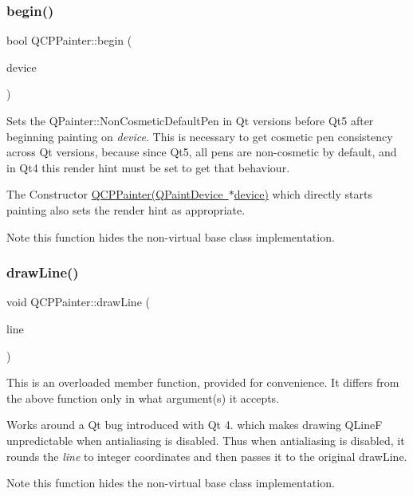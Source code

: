 \subsubsection{\texorpdfstring{begin()}{begin()}}
{\footnotesize\ttfamily bool Q\+C\+P\+Painter\+::begin (\begin{DoxyParamCaption}\item[{Q\+Paint\+Device $\ast$}]{device }\end{DoxyParamCaption})}

Sets the Q\+Painter\+::\+Non\+Cosmetic\+Default\+Pen in Qt versions before Qt5 after beginning painting on {\itshape device}. This is necessary to get cosmetic pen consistency across Qt versions, because since Qt5, all pens are non-\/cosmetic by default, and in Qt4 this render hint must be set to get that behaviour.

The Constructor \mbox{\hyperlink{class_q_c_p_painter_ae58dbb1795ddc4351ab324dc9898aa22}{Q\+C\+P\+Painter(\+Q\+Paint\+Device $\ast$device)}} which directly starts painting also sets the render hint as appropriate.

\begin{DoxyNote}{Note}
this function hides the non-\/virtual base class implementation. 
\end{DoxyNote}
\mbox{\label{class_q_c_p_painter_a0b4b1b9bd495e182c731774dc800e6e0}} 
\subsubsection{\texorpdfstring{draw\+Line()}{drawLine()}}
{\footnotesize\ttfamily void Q\+C\+P\+Painter\+::draw\+Line (\begin{DoxyParamCaption}\item[{const Q\+LineF \&}]{line }\end{DoxyParamCaption})}

This is an overloaded member function, provided for convenience. It differs from the above function only in what argument(s) it accepts.

Works around a Qt bug introduced with Qt 4. which makes drawing Q\+LineF unpredictable when antialiasing is disabled. Thus when antialiasing is disabled, it rounds the {\itshape line} to integer coordinates and then passes it to the original draw\+Line.

\begin{DoxyNote}{Note}
this function hides the non-\/virtual base class implementation. 
\end{DoxyNote}
\mbox{\label{class_q_c_p_painter_a7e63fbcf47e35c6f2ecd11b8fef7c7d8}} 
